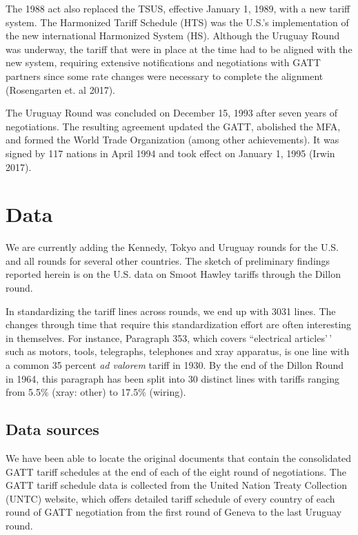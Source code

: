 \documentclass[
  12pt,
]{article}
\begin{document}
The 1988 act also replaced the TSUS, effective January 1, 1989, with a new tariff system. The Harmonized Tariff Schedule (HTS) was the U.S.'s implementation of the new international Harmonized System (HS). Although the Uruguay Round was underway, the tariff that were in place at the time had to be aligned with the new system, requiring extensive notifications and negotiations with GATT partners since some rate changes were necessary to complete the alignment (Rosengarten et. al 2017).

The Uruguay Round was concluded on December 15, 1993 after seven years of negotiations. The resulting agreement updated the GATT, abolished the MFA, and formed the World Trade Organization (among other achievements). It was signed by 117 nations in April 1994 and took effect on January 1, 1995 (Irwin 2017).

\hypertarget{data}{%
\section{Data}\label{data}}

We are currently adding the Kennedy, Tokyo and Uruguay rounds for the U.S. and all rounds for several other countries. The sketch of preliminary findings reported herein is on the U.S. data on Smoot Hawley tariffs through the Dillon round.

In standardizing the tariff lines across rounds, we end up with 3031 lines. The changes through time that require this standardization effort are often interesting in themselves. For instance, Paragraph 353, which covers ``electrical articles'\,' such as motors, tools, telegraphs, telephones and xray apparatus, is one line with a common 35 percent \emph{ad valorem} tariff in 1930. By the end of the Dillon Round in 1964, this paragraph has been split into 30 distinct lines with tariffs ranging from 5.5\% (xray: other) to 17.5\% (wiring).

\hypertarget{data-sources}{%
\subsection{Data sources}\label{data-sources}}

We have been able to locate the original documents that contain the consolidated GATT tariff schedules at the end of each of the eight round of negotiations. The GATT tariff schedule data is collected from the United Nation Treaty Collection (UNTC) website, which offers detailed tariff schedule of every country of each round of GATT negotiation from the first round of Geneva to the last Uruguay round.
\end{document}
